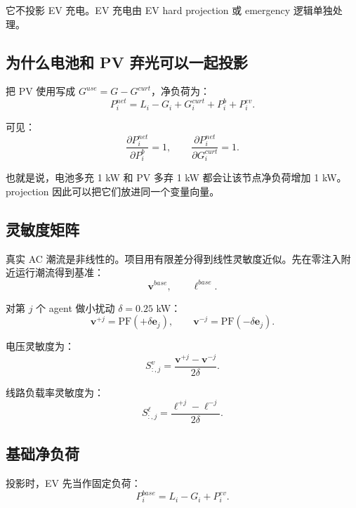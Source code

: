 \documentclass[UTF8,zihao=-4]{ctexart}
\begin{document}
它不投影 EV 充电。EV 充电由 EV hard projection 或 emergency 逻辑单独处理。

\subsection{为什么电池和 PV 弃光可以一起投影}

把 PV 使用写成 $G^{use}=G-G^{curt}$，净负荷为：
\begin{equation}
P^{net}_i
=
L_i-G_i+G^{curt}_i+P^b_i+P^{ev}_i.
\end{equation}

可见：
\begin{equation}
\frac{\partial P^{net}_i}{\partial P^b_i}=1,
\qquad
\frac{\partial P^{net}_i}{\partial G^{curt}_i}=1.
\end{equation}

也就是说，电池多充 1 kW 和 PV 多弃 1 kW 都会让该节点净负荷增加 1 kW。projection 因此可以把它们放进同一个变量向量。

\subsection{灵敏度矩阵}

真实 AC 潮流是非线性的。项目用有限差分得到线性灵敏度近似。先在零注入附近运行潮流得到基准：
\begin{equation}
\bm v^{base},\qquad \bm \ell^{base}.
\end{equation}

对第 $j$ 个 agent 做小扰动 $\delta=0.25$ kW：
\begin{equation}
\bm v^{+j}=\text{PF}(+\delta\bm e_j),
\qquad
\bm v^{-j}=\text{PF}(-\delta\bm e_j).
\end{equation}

电压灵敏度为：
\begin{equation}
S^v_{:,j}
=
\frac{\bm v^{+j}-\bm v^{-j}}{2\delta}.
\end{equation}

线路负载率灵敏度为：
\begin{equation}
S^\ell_{:,j}
=
\frac{\bm \ell^{+j}-\bm \ell^{-j}}{2\delta}.
\end{equation}

\subsection{基础净负荷}

投影时，EV 先当作固定负荷：
\begin{equation}
P^{base}_i=L_i-G_i+P^{ev}_i.
\end{equation}
\end{document}
